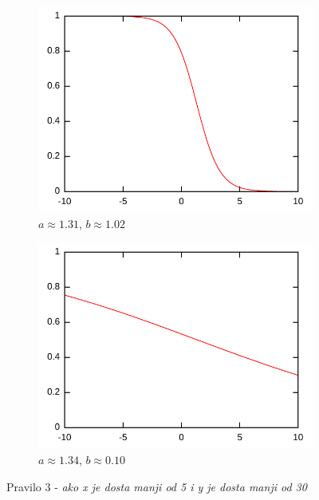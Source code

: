 \documentclass{article}
\begin{document}
\begin{figure}[h]
    \centering
    \begin{subfigure}[b]{0.49\textwidth}
        \centering
        \includegraphics[width=\textwidth]{img/rule-3-A.pdf}
        \caption{$ a \approx 1.31 $, $ b \approx 1.02 $}
    \end{subfigure}
    \hfill
    \begin{subfigure}[b]{0.49\textwidth}
        \centering
        \includegraphics[width=\textwidth]{img/rule-3-B.pdf}
        \caption{$ a \approx 1.34 $, $ b \approx 0.10 $}
    \end{subfigure}
    \hfill
    \caption{Pravilo 3 - \textit{ako x je dosta manji od 5 i y je dosta manji od 30}}
    \label{rule-3}
\end{figure}
\end{document}
